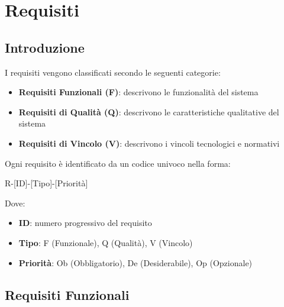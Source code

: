 \section{Requisiti}

\subsection{Introduzione}
I requisiti vengono classificati secondo le seguenti categorie:
\begin{itemize}
    \item \textbf{Requisiti Funzionali (F)}: descrivono le funzionalità del sistema
    \item \textbf{Requisiti di Qualità (Q)}: descrivono le caratteristiche qualitative del sistema
    \item \textbf{Requisiti di Vincolo (V)}: descrivono i vincoli tecnologici e normativi
\end{itemize}

Ogni requisito è identificato da un codice univoco nella forma:
\begin{center}
R-[ID]-[Tipo]-[Priorità]
\end{center}

Dove:
\begin{itemize}
    \item \textbf{ID}: numero progressivo del requisito
    \item \textbf{Tipo}: F (Funzionale), Q (Qualità), V (Vincolo)
    \item \textbf{Priorità}: Ob (Obbligatorio), De (Desiderabile), Op (Opzionale)
\end{itemize}

\newpage

\subsection{Requisiti Funzionali}

\setlength{\LTleft}{0cm}
\renewcommand{\arraystretch}{1.3}

